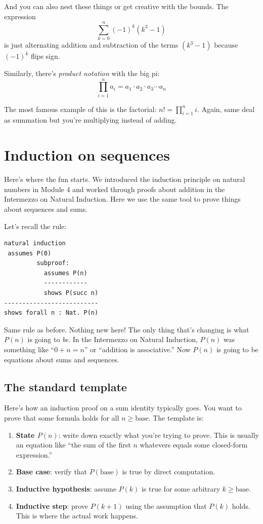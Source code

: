 \documentclass[11pt]{article}
\begin{document}
And you can also nest these things or get creative with the bounds. The expression
\[
\sum_{k=0}^{n} (-1)^k (k^3 - 1)
\]
is just alternating addition and subtraction of the terms $(k^3 - 1)$ because $(-1)^k$ flips sign.

Similarly, there's \emph{product notation} with the big pi:
\[
\prod_{i=1}^{n} a_i = a_1 \cdot a_2 \cdot a_3 \cdots a_n
\]

The most famous example of this is the factorial: $n! = \prod_{i=1}^{n} i$. Again, same deal as summation but you're multiplying instead of adding.

\section{Induction on sequences}
Here's where the fun starts. We introduced the induction principle on natural numbers in Module 4 and worked through proofs about addition in the Intermezzo on Natural Induction. Here we use the same tool to prove things about sequences and sums.

Let's recall the rule:
\begin{lstlisting}
natural induction
 assumes P(0)
         subproof:
           assumes P(n)
           ------------
           shows P(succ n)
--------------------------
shows forall n : Nat. P(n)
\end{lstlisting}

Same rule as before. Nothing new here! The only thing that's changing is what $P(n)$ is going to \emph{be}. In the Intermezzo on Natural Induction, $P(n)$ was something like ``$0 + n = n$'' or ``addition is associative.'' Now $P(n)$ is going to be equations about sums and sequences.

\subsection{The standard template}
Here's how an induction proof on a sum identity typically goes. You want to prove that some formula holds for all $n \geq \text{base}$. The template is:
\begin{enumerate}
\item \textbf{State $P(n)$}: write down exactly what you're trying to prove. This is usually an equation like ``the sum of the first $n$ whatevers equals some closed-form expression.''
\item \textbf{Base case}: verify that $P(\text{base})$ is true by direct computation.
\item \textbf{Inductive hypothesis}: assume $P(k)$ is true for some arbitrary $k \geq \text{base}$.
\item \textbf{Inductive step}: prove $P(k+1)$ using the assumption that $P(k)$ holds. This is where the actual work happens.
\end{enumerate}
\end{document}
